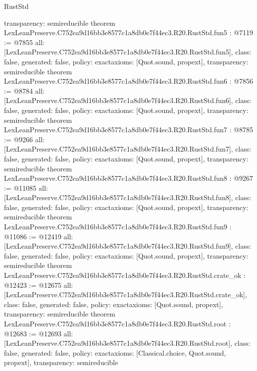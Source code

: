 \begin{lexlean}{RustStd}
\begin{coremodule}
{  transparency: semireducible
}
theorem LexLeanPreserve.C752ea9d16bb3e8577c1a8db0e7f44ec3.R20.RustStd.fun5 : @7119 := @7855 {
  all: [LexLeanPreserve.C752ea9d16bb3e8577c1a8db0e7f44ec3.R20.RustStd.fun5],
  class: false,
  generated: false,
  policy: exact{axioms: [Quot.sound, propext]},
  transparency: semireducible
}
theorem LexLeanPreserve.C752ea9d16bb3e8577c1a8db0e7f44ec3.R20.RustStd.fun6 : @7856 := @8784 {
  all: [LexLeanPreserve.C752ea9d16bb3e8577c1a8db0e7f44ec3.R20.RustStd.fun6],
  class: false,
  generated: false,
  policy: exact{axioms: [Quot.sound, propext]},
  transparency: semireducible
}
theorem LexLeanPreserve.C752ea9d16bb3e8577c1a8db0e7f44ec3.R20.RustStd.fun7 : @8785 := @9266 {
  all: [LexLeanPreserve.C752ea9d16bb3e8577c1a8db0e7f44ec3.R20.RustStd.fun7],
  class: false,
  generated: false,
  policy: exact{axioms: [Quot.sound, propext]},
  transparency: semireducible
}
theorem LexLeanPreserve.C752ea9d16bb3e8577c1a8db0e7f44ec3.R20.RustStd.fun8 : @9267 := @11085 {
  all: [LexLeanPreserve.C752ea9d16bb3e8577c1a8db0e7f44ec3.R20.RustStd.fun8],
  class: false,
  generated: false,
  policy: exact{axioms: [Quot.sound, propext]},
  transparency: semireducible
}
theorem LexLeanPreserve.C752ea9d16bb3e8577c1a8db0e7f44ec3.R20.RustStd.fun9 : @11086 := @12419 {
  all: [LexLeanPreserve.C752ea9d16bb3e8577c1a8db0e7f44ec3.R20.RustStd.fun9],
  class: false,
  generated: false,
  policy: exact{axioms: [Quot.sound, propext]},
  transparency: semireducible
}
theorem LexLeanPreserve.C752ea9d16bb3e8577c1a8db0e7f44ec3.R20.RustStd.crate_ok : @12423 := @12675 {
  all: [LexLeanPreserve.C752ea9d16bb3e8577c1a8db0e7f44ec3.R20.RustStd.crate_ok],
  class: false,
  generated: false,
  policy: exact{axioms: [Quot.sound, propext]},
  transparency: semireducible
}
theorem LexLeanPreserve.C752ea9d16bb3e8577c1a8db0e7f44ec3.R20.RustStd.root : @12683 := @12693 {
  all: [LexLeanPreserve.C752ea9d16bb3e8577c1a8db0e7f44ec3.R20.RustStd.root],
  class: false,
  generated: false,
  policy: exact{axioms: [Classical.choice, Quot.sound, propext]},
  transparency: semireducible
}


\end{coremodule}
\end{lexlean}
